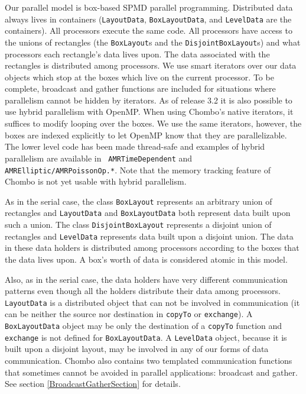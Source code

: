 Our parallel model is box-based SPMD parallel programming.  
Distributed data always lives in containers ({\tt LayoutData},
{\tt BoxLayoutData}, and {\tt LevelData} are the containers).
All processors execute the same code.  
All processors have access to
the unions of rectangles (the {\tt BoxLayout}s and the 
{\tt DisjointBoxLayout}s) and what processors each rectangle's 
data lives upon.  The data associated with  the rectangles
is distributed among processors.   We use smart iterators
over our data objects which stop at the boxes which live
on the current processor.  To be complete,
broadcast and gather functions are included for
situations where parallelism cannot be hidden by iterators.
As of release 3.2 it is also possible to use hybrid parallelism with
OpenMP. When using Chombo's native iterators, it suffices to modify
looping over the boxes. We use the same iterators, however, the boxes
are indexed explicitly to let OpenMP know that they are
parallelizable. The lower level code has been made thread-safe and
examples of hybrid parallelism are available in {\tt
  AMRTimeDependent} and {\tt AMRElliptic/AMRPoissonOp.*}. Note that
the memory tracking feature of Chombo is not yet usable with hybrid
parallelism.

As in the serial case,
the class {\tt BoxLayout} represents an arbitrary
union of rectangles and  {\tt LayoutData} and {\tt BoxLayoutData} 
both represent data built upon such a union. 
The class {\tt DisjointBoxLayout} represents a disjoint 
union of rectangles and  {\tt LevelData} 
represents data built upon a disjoint union.   The data
in these data holders is distributed among processors according
to the boxes that the data lives upon.   A box's worth of data 
is considered atomic in this model.

Also, as in the serial case, the data holders
have very different communication patterns even
though all the holders distribute their data among processors.
{\tt LayoutData} is a distributed 
object that can not be   involved in communication (it can
be neither the source nor destination in 
{\tt copyTo} or {\tt exchange}).  
A {\tt BoxLayoutData} object may be only the destination
of a {\tt copyTo} function and {\tt exchange} is not defined
for {\tt BoxLayoutData}.  A {\tt LevelData} object, because
it is built upon a disjoint layout,  may be involved
in any of our forms of data communication.  
Chombo also contains two templated communication functions that 
sometimes cannot be avoided in parallel applications: broadcast
and gather.  See section 
\ref{BroadcastGatherSection} for details.

